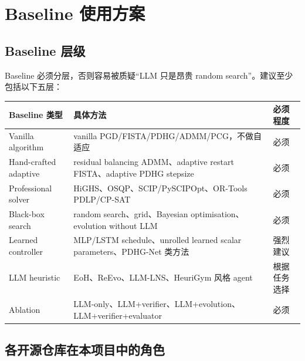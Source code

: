 \documentclass[12pt,a4paper]{ctexart}
\begin{document}
\section{Baseline 使用方案}

\subsection{Baseline 层级}
Baseline 必须分层，否则容易被质疑“LLM 只是昂贵 random search”。建议至少包括以下五层：

\begin{longtable}{p{}p{}p{}}
\toprule
Baseline 类型 & 具体方法 & 必须程度 \\
\midrule
Vanilla algorithm & vanilla PGD/FISTA/PDHG/ADMM/PCG，不做自适应 & 必须 \\
Hand-crafted adaptive & residual balancing ADMM、adaptive restart FISTA、adaptive PDHG stepsize & 必须 \\
Professional solver & HiGHS、OSQP、SCIP/PySCIPOpt、OR-Tools PDLP/CP-SAT & 必须 \\
Black-box search & random search、grid、Bayesian optimisation、evolution without LLM & 必须 \\
Learned controller & MLP/LSTM schedule、unrolled learned scalar parameters、PDHG-Net 类方法 & 强烈建议 \\
LLM heuristic & EoH、ReEvo、LLM-LNS、HeuriGym 风格 agent & 根据任务选择 \\
Ablation & LLM-only、LLM+verifier、LLM+evolution、LLM+verifier+evaluator & 必须 \\
\bottomrule
\end{longtable}

\subsection{各开源仓库在本项目中的角色}
\end{document}
